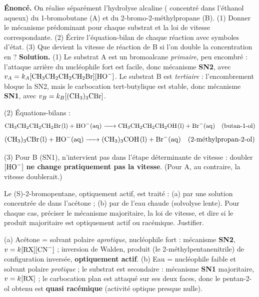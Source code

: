 \documentclass[11pt]{article}
\begin{document}
\begin{exoresolu}
\textbf{Énoncé.} On réalise séparément l'hydrolyse alcaline ( concentré dans l'éthanol aqueux) du 1-bromobutane (A) et du 2-bromo-2-méthylpropane (B). (1) Donner le mécanisme prédominant pour chaque substrat et la loi de vitesse correspondante. (2) Écrire l'équation-bilan de chaque réaction avec symboles d'état. (3) Que devient la vitesse de réaction de B si l'on double la concentration en  ?
\tcblower
\textbf{Solution.} (1) Le substrat A est un bromoalcane \emph{primaire}, peu encombré : l'attaque arrière du nucléophile fort  est facile, donc mécanisme \textbf{SN2}, avec $v_A = k_A[\ce{CH3CH2CH2CH2Br}][\ce{HO^-}]$. Le substrat B est \emph{tertiaire} : l'encombrement bloque la SN2, mais le carbocation tert-butylique est stable, donc mécanisme \textbf{SN1}, avec $v_B = k_B[\ce{(CH3)3CBr}]$.

(2) Équations-bilans :
\[ \ce{CH3CH2CH2CH2Br(l) + HO^-(aq) -> CH3CH2CH2CH2OH(l) + Br^-(aq)} \quad \text{(butan-1-ol)} \]
\[ \ce{(CH3)3CBr(l) + HO^-(aq) -> (CH3)3COH(l) + Br^-(aq)} \quad \text{(2-méthylpropan-2-ol)} \]

(3) Pour B (SN1),  n'intervient pas dans l'étape déterminante de vitesse : doubler $[\ce{HO^-}]$ \textbf{ne change pratiquement pas la vitesse}. (Pour A, au contraire, la vitesse doublerait.)
\end{exoresolu}

\begin{exercice}
Le (S)-2-bromopentane, optiquement actif, est traité : (a) par une solution concentrée de  dans l'acétone ; (b) par de l'eau chaude (solvolyse lente). Pour chaque cas, préciser le mécanisme majoritaire, la loi de vitesse, et dire si le produit majoritaire est optiquement actif ou racémique. Justifier.
\end{exercice}

\begin{corrige}[Exercice 1]
(a) Acétone = solvant polaire \emph{aprotique},  nucléophile fort : mécanisme \textbf{SN2}, $v = k[\ce{RX}][\ce{CN^-}]$ ; inversion de Walden, produit (le 2-méthylpentanenitrile) de configuration inversée, \textbf{optiquement actif}. (b) Eau = nucléophile faible et solvant polaire \emph{protique} ; le substrat est secondaire : mécanisme \textbf{SN1} majoritaire, $v = k[\ce{RX}]$ ; le carbocation plan est attaqué sur ses deux faces, donc le pentan-2-ol obtenu est \textbf{quasi racémique} (activité optique presque nulle).
\end{corrige}
\end{document}
